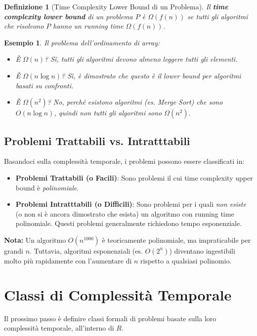\documentclass[a4paper]{article}
\newtheorem{definition}{Definizione}[section]
\newtheorem{example}{Esempio}[section]
\begin{document}
\begin{definition}[Time Complexity Lower Bound di un Problema]
Il \textbf{time complexity lower bound} di un problema $P$ è $\Omega(f(n))$ se \emph{tutti gli algoritmi} che risolvono $P$ hanno un running time $\Omega(f(n))$.
\end{definition}
\begin{example}
Il problema dell'ordinamento di array:
\begin{itemize}
    \item È $\Omega(n)$? Sì, tutti gli algoritmi devono almeno leggere tutti gli elementi.
    \item È $\Omega(n \log n)$? Sì, è dimostrato che questo è il lower bound per algoritmi basati su confronti.
    \item È $\Omega(n^2)$? No, perché esistono algoritmi (es. Merge Sort) che sono $O(n \log n)$, quindi non tutti gli algoritmi sono $\Omega(n^2)$.
\end{itemize}
\end{example}

\subsection{Problemi Trattabili vs. Intratttabili}
Basandoci sulla complessità temporale, i problemi possono essere classificati in:
\begin{itemize}
    \item \textbf{Problemi Trattabili (o Facili)}: Sono problemi il cui time complexity upper bound è \emph{polinomiale}.
    \item \textbf{Problemi Intratttabili (o Difficili)}: Sono problemi per i quali \emph{non esiste} (o non si è ancora dimostrato che esista) un algoritmo con running time polinomiale. Questi problemi generalmente richiedono tempo esponenziale.
\end{itemize}
\textbf{Nota:} Un algoritmo $O(n^{1000})$ è teoricamente polinomiale, ma impraticabile per grandi $n$. Tuttavia, algoritmi esponenziali (es. $O(2^n)$) diventano ingestibili molto più rapidamente con l'aumentare di $n$ rispetto a qualsiasi polinomio.

\section{Classi di Complessità Temporale}

Il prossimo passo è definire classi formali di problemi basate sulla loro complessità temporale, all'interno di $R$.
\end{document}
